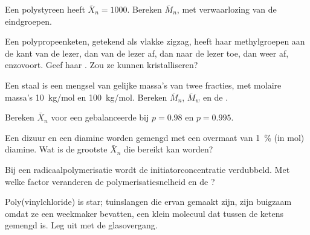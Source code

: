 \begin{exercise}[$\star$]\label{exo:b2:polymer-synthesis:3}
Een polystyreen heeft $\bar X_n = 1000$. Bereken $\bar M_n$, met verwaarlozing van de eindgroepen.
\end{exercise}

\begin{exercise}[$\star$]\label{exo:b2:polymer-synthesis:4}
Een polypropeenketen, getekend als vlakke zigzag, heeft haar methylgroepen aan de kant van de lezer, dan
van de lezer af, dan naar de lezer toe, dan weer af, enzovoort. Geef haar . Zou ze kunnen kristalliseren?
\end{exercise}

\begin{exercise}[$\star\star$]\label{exo:b2:polymer-synthesis:5}
Een staal is een mengsel van gelijke massa's van twee fracties, met molaire massa's \qty{10}{kg/mol} en
\qty{100}{kg/mol}. Bereken $\bar M_n$, $\bar M_w$ en de .
\end{exercise}

\begin{exercise}[$\star\star$]\label{exo:b2:polymer-synthesis:6}
Bereken $\bar X_n$ voor een gebalanceerde  bij $p = 0.98$ en $p = 0.995$.
\end{exercise}

\begin{exercise}[$\star\star$]\label{exo:b2:polymer-synthesis:7}
Een dizuur en een diamine worden gemengd met een overmaat van 1~\% (in mol) diamine. Wat is de grootste
$\bar X_n$ die bereikt kan worden?
\end{exercise}

\begin{exercise}[$\star\star$]\label{exo:b2:polymer-synthesis:8}
Bij een radicaalpolymerisatie wordt de initiatorconcentratie verdubbeld. Met welke factor veranderen de
polymerisatiesnelheid en de ?
\end{exercise}

\begin{exercise}[$\star\star$]\label{exo:b2:polymer-synthesis:9}
Poly(vinylchloride) is star; tuinslangen die ervan gemaakt zijn, zijn buigzaam omdat ze een weekmaker bevatten,
een klein molecuul dat tussen de ketens gemengd is. Leg uit met de glasovergang.
\end{exercise}

